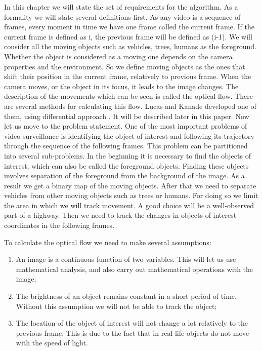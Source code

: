 \documentclass[12pt,a4paper,oneside,titlepage]{article}
\begin{document}
In this chapter we will state the set of requirements for the algorithm.
As a formality we will state several definitions first.
As any video is a sequence of frames, every moment in time we have one frame called the current frame.
If the current frame is defined as i, the previous frame will be defined as (i-1).
We will consider all the moving objects such as vehicles, trees, humans as the foreground.
Whether the object is considered as a moving one depends on the camera properties and the environment.
So we define moving objects as the ones that shift their position in the current frame, relatively to previous frame.
When the camera moves, or the object in its focus, it leads to the image changes.
The description of the movements which can be seen is called the optical flow.
There are several methods for calculating this flow.
Lucas and Kanade developed one of them, using differential approach \cite{lucaskanade}.
It will be described later in this paper.
Now let us move to the problem statement.
One of the most important problems of video surveillance is identifying the object of interest and following its trajectory through the sequence of the following frames.
This problem can be partitioned into several sub-problems.
In the beginning it is necessary to find the objects of interest, which can also be called the foreground objects.
Finding these objects involves separation of the foreground from the background of the image.
As a result we get a binary map of the moving objects.
After that we need to separate vehicles from other moving objects such as trees or humans. 
For doing so we limit the area in which we will track movement.
A good choice will be a well-observed part of a highway. 
Then we need to track the changes in objects of interest coordinates in the following frames.

To calculate the optical flow we need to make several assumptions:
\begin{enumerate}
  \item An image is a continuous function of two variables. This will let us use mathematical analysis, and also carry out mathematical operations with the image;
  \item The brightness of an object remains constant in a short period of time. Without this assumption we will not be able to track the object;
  \item The location of the object of interest will not change a lot relatively to the previous frame. This is due to the fact that in real life objects do not move with the speed of light.
\end{enumerate}
\end{document}

